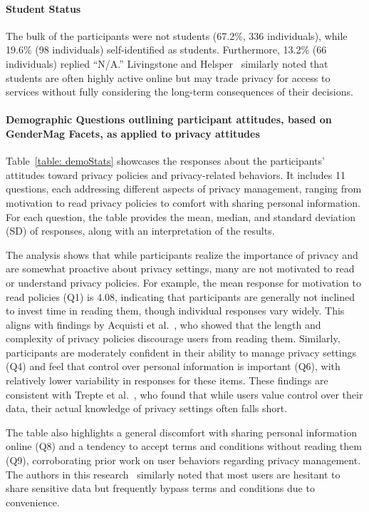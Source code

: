 \paragraph{Student Status}
The bulk of the participants were not students (67.2\%, 336 individuals), while 19.6\% (98 individuals) self-identified as students.
Furthermore, 13.2\% (66 individuals) replied ``N/A.'' Livingstone and Helsper~\cite{livingstone2007gradations} similarly noted that students are often highly active online but may trade privacy for access to services without fully considering the long-term consequences of their decisions.



\paragraph{Demographic Questions outlining participant attitudes, based on GenderMag Facets, as applied to privacy attitudes}
Table~\ref{table: demoStats} showcases the responses about the participants' attitudes toward privacy policies and privacy-related behaviors.
It includes 11 questions, each addressing different aspects of privacy management, ranging from motivation to read privacy policies to comfort with sharing personal information.
For each question, the table provides the mean, median, and standard deviation (SD) of responses, along with an interpretation of the results.

The analysis shows that while participants realize the importance of privacy and are somewhat proactive about privacy settings, many are not motivated to read or understand privacy policies.
For example, the mean response for motivation to read policies (Q1) is 4.08, indicating that participants are generally not inclined to invest time in reading them, though individual responses vary widely. This aligns with findings by Acquisti et al.~\cite{acquisti2015privacy}, who showed that the length and complexity of privacy policies discourage users from reading them.
Similarly, participants are moderately confident in their ability to manage privacy settings (Q4) and feel that control over personal information is important (Q6), with relatively lower variability in responses for these items. 
These findings are consistent with Trepte et al.~\cite{trepte2011privacy}, who found that while users value control over their data, their actual knowledge of privacy settings often falls short.

The table also highlights a general discomfort with sharing personal information online (Q8) and a tendency to accept terms and conditions without reading them (Q9), corroborating prior work on user behaviors regarding privacy management.
The authors in this research~\cite{gross2005information} similarly noted that most users are hesitant to share sensitive data but frequently bypass terms and conditions due to convenience.

